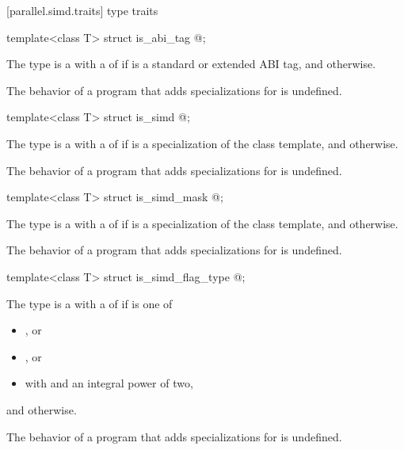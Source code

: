 [parallel.simd.traits]{ type traits}

\begin{itemdecl}
template<class T> struct is_abi_tag { @\seebelow@ };
\end{itemdecl}

\begin{itemdescr}
\pnum
The type  is a  with a  of  if  is a standard or extended ABI tag, and  otherwise.

\pnum
The behavior of a program that adds specializations for  is undefined.
\end{itemdescr}

\begin{itemdecl}
template<class T> struct is_simd { @\seebelow@ };
\end{itemdecl}

\begin{itemdescr}
\pnum
The type  is a  with a  of  if  is a specialization of the  class template, and  otherwise.

\pnum
The behavior of a program that adds specializations for  is undefined.
\end{itemdescr}

\begin{itemdecl}
template<class T> struct is_simd_mask { @\seebelow@ };
\end{itemdecl}

\begin{itemdescr}
\pnum
The type  is a  with a  of  if  is a specialization of the  class template, and  otherwise.

\pnum
The behavior of a program that adds specializations for  is undefined.
\end{itemdescr}

\begin{itemdecl}
template<class T> struct is_simd_flag_type { @\seebelow@ };
\end{itemdecl}

\begin{itemdescr}
\pnum
The type  is a  with a  of  if  is one of
\begin{itemize}
  \item {}, or
  \item {}, or
  \item {} with  and  an integral power of two,
\end{itemize}
and  otherwise.

\pnum
The behavior of a program that adds specializations for  is undefined.
\end{itemdescr}

